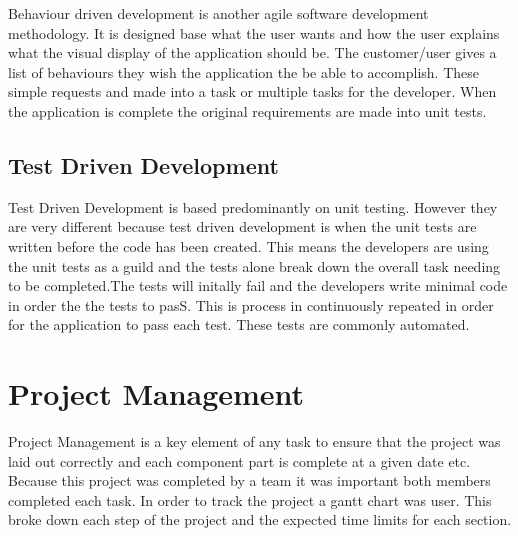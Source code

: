Behaviour driven development is another agile software development methodology. It is designed base what the user wants and how the user explains what the visual display of the application should be. The customer/user gives a list of behaviours they wish the application the be able to accomplish. These simple requests and made into a task or multiple tasks for the developer. When the application is complete the original requirements are made into unit tests.\cite{BDD} 

\subsection{Test Driven Development}

Test Driven Development is based predominantly on unit testing. However they are very different because test driven development is when the unit tests are written before the code has been created. This means the developers are using the unit tests as a guild and the tests alone break down the overall task needing to be completed.The tests will initally fail and the developers write minimal code in order the the tests to pasS. This is process in continuously repeated in order for the application to pass each test. These tests are commonly automated.\cite{TDD}

\section{Project Management}

Project Management is a key element of any task to ensure that the project was laid out correctly and each component part is complete at a given date etc. Because this project was completed by a team it was important both members completed each task. In order to track the project a gantt chart was user. This broke down each step of the project and the expected time limits for each section.










 



